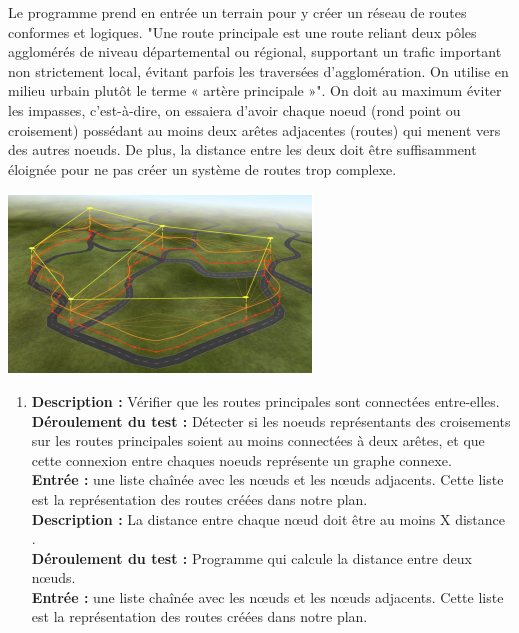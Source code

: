 {Le programme prend en entrée un terrain pour y créer un réseau de routes conformes et logiques. "Une route principale est une route reliant deux pôles agglomérés de niveau départemental ou régional, supportant un trafic important non strictement local, évitant parfois les traversées d'agglomération. On utilise en milieu urbain plutôt le terme « artère principale »". On doit au maximum éviter les impasses, c'est-à-dire, on essaiera d'avoir chaque noeud (rond point ou croisement) possédant au moins deux arêtes adjacentes (routes) qui menent vers des autres noeuds. \cite{routePrincipale} De plus, la distance entre les deux doit être suffisamment éloignée pour ne pas créer un système de routes trop complexe.
\begin{center}
    \centering
    \includegraphics[height = 3 cm]{images/route_principale.png}\\
\end{center}
}
{}
{
    \begin{enumerate}
    \item \textbf{\tab Description : } Vérifier que les routes principales sont connectées entre-elles.  \\
    \textbf{\tab Déroulement du test : }  Détecter si les noeuds représentants des croisements sur les routes principales soient au moins connectées à deux arêtes, et que cette connexion entre chaques noeuds représente un graphe connexe.\\
    \textbf{\tab Entrée : } une liste chaînée avec les nœuds et les nœuds adjacents. Cette liste est la représentation des routes créées dans notre plan. \\
    
    \textbf{\tab Description : } La distance entre chaque nœud doit être au moins X distance .\\  
    \textbf{\tab Déroulement du test : }  Programme qui calcule la distance entre deux nœuds.\\
    \textbf{\tab Entrée : } une liste chaînée avec les nœuds et les nœuds adjacents. Cette liste est la représentation des routes créées dans notre plan. \\

  \end{enumerate}
}

